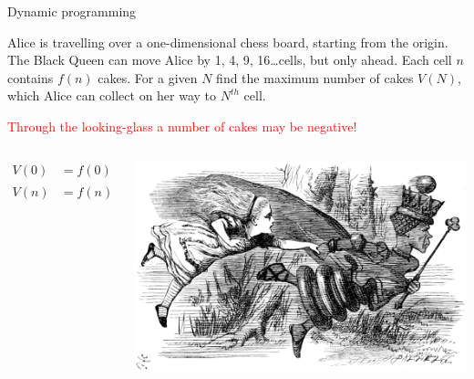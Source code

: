 \documentclass[handout]{beamer}
\begin{document}
\begin{frame}[fragile]{Dynamic programming}

\begin{problem}
Alice is travelling over a one-dimensional chess board,
starting from the origin.
The Black Queen can move Alice
by 1, 4, 9, 16\dots cells, but only ahead.
Each cell $n$ contains $f(n)$ cakes.
For a given $N$ find
the maximum number of cakes $V(N)$, which Alice can collect
on her way to $N^{th}$ cell.
\end{problem}

\centerline{\textcolor{red}{
Through the looking-glass
a number of cakes may be negative!
}
}

\begin{columns}[T]
  \begin{column}{.5\textwidth}

  \begin{align*}
  V(0) &= f(0) \\
  V(n) &= f(n) + \max_{1 \le k \le \sqrt{n}} V(n - k^2)
  \end{align*}

\end{column}

\begin{column}{.5\textwidth}
  \includegraphics[width=1.13\textwidth]{alice-and-queen.png}
\end{column}

\end{columns}


\end{frame}
\end{document}
